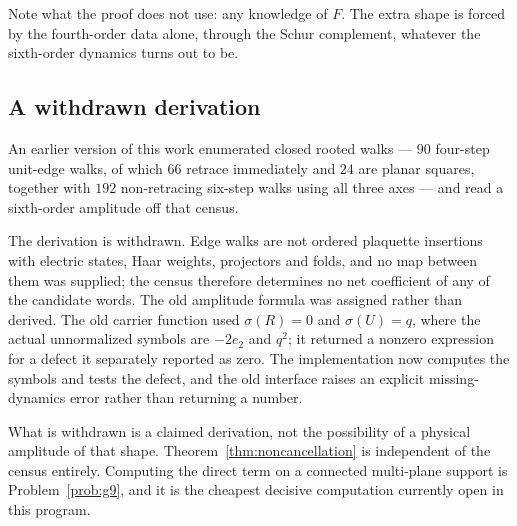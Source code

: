 Note what the proof does not use: any knowledge of $F$. The extra shape
is forced by the fourth-order data alone, through the Schur complement,
whatever the sixth-order dynamics turns out to be.

\subsection{A withdrawn derivation}

An earlier version of this work enumerated closed rooted walks --- $90$
four-step unit-edge walks, of which $66$ retrace immediately and $24$
are planar squares, together with $192$ non-retracing six-step walks
using all three axes --- and read a sixth-order amplitude off that
census.

The derivation is withdrawn. Edge walks are not ordered plaquette
insertions with electric states, Haar weights, projectors and folds, and
no map between them was supplied; the census therefore determines no net
coefficient of any of the candidate words. The old amplitude formula was
assigned rather than derived. The old carrier function used
$\sigma(R) = 0$ and $\sigma(U) = q$, where the actual unnormalized
symbols are $-2e_2$ and $q^2$; it returned a nonzero expression for a
defect it separately reported as zero. The implementation now computes
the symbols and tests the defect, and the old interface raises an
explicit missing-dynamics error rather than returning a number.

What is withdrawn is a claimed derivation, not the possibility of a
physical amplitude of that shape. Theorem~\ref{thm:noncancellation} is
independent of the census entirely. Computing the direct term on a
connected multi-plane support is Problem~\ref{prob:g9}, and it is the
cheapest decisive computation currently open in this program.
